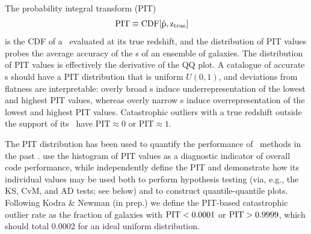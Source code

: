 The probability integral transform (PIT)
\begin{align}
\eqlabel{eq:pit}
\mathrm{PIT} &\equiv \rm{CDF}[\hat{p}, z_{\rm true}]
\end{align}
is the CDF of a \pzpdf\ evaluated at its true redshift, and the distribution of PIT values probes the average accuracy of the \pzpdf s of an ensemble of galaxies.
The distribution of PIT values is effectively the derivative of the QQ plot.
A catalogue of accurate \pzpdf s should have a PIT distribution that is uniform $U(0,1)$, and deviations from flatness are interpretable: overly broad \pzpdf s induce underrepresentation of the lowest and highest PIT values, whereas overly narrow \pzpdf s induce overrepresentation of the lowest and highest PIT values.
Catastrophic outliers with a true redshift outside the support of its \pzpdf\ have $\mathrm{PIT} \approx 0$ or $\mathrm{PIT} \approx 1$.

The PIT distribution has been used to quantify the performance of \pzpdf\ methods in the past \citep[e.~g.~][]{Bordoloi:10,Polsterer:16,Tanaka:17}.
\citet{Tanaka:17} use the histogram of PIT values as a diagnostic indicator of overall code performance, while \citet{Freeman:17} independently define the PIT and demonstrate how its individual values may be used both to perform hypothesis testing (via, e.g., the KS, CvM, and AD tests; see below) and to construct quantile-quantile plots.
Following Kodra \& Newman (in prep.) we define the PIT-based catastrophic outlier rate as the fraction of galaxies with $\rm{PIT} < 0.0001$ or $\rm{PIT} > 0.9999$, which should total 0.0002 for an ideal uniform distribution.


